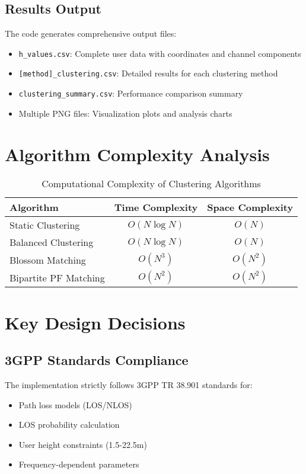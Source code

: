 \documentclass[11pt,a4paper]{article}
\begin{document}
\subsection{Results Output}

The code generates comprehensive output files:

\begin{itemize}
    \item \texttt{h\_values.csv}: Complete user data with coordinates and channel components
    \item \texttt{[method]\_clustering.csv}: Detailed results for each clustering method
    \item \texttt{clustering\_summary.csv}: Performance comparison summary
    \item Multiple PNG files: Visualization plots and analysis charts
\end{itemize}

\section{Algorithm Complexity Analysis}

\begin{table}[H]
\centering
\begin{tabular}{@{}lcc@{}}
\toprule
\textbf{Algorithm} & \textbf{Time Complexity} & \textbf{Space Complexity} \\
\midrule
Static Clustering & $O(N \log N)$ & $O(N)$ \\
Balanced Clustering & $O(N \log N)$ & $O(N)$ \\
Blossom Matching & $O(N^3)$ & $O(N^2)$ \\
Bipartite PF Matching & $O(N^2)$ & $O(N^2)$ \\
\bottomrule
\end{tabular}
\caption{Computational Complexity of Clustering Algorithms}
\label{tab:complexity}
\end{table}

\section{Key Design Decisions}

\subsection{3GPP Standards Compliance}

The implementation strictly follows 3GPP TR 38.901 standards for:
\begin{itemize}
    \item Path loss models (LOS/NLOS)
    \item LOS probability calculation
    \item User height constraints (1.5-22.5m)
    \item Frequency-dependent parameters
\end{itemize}
\end{document}
